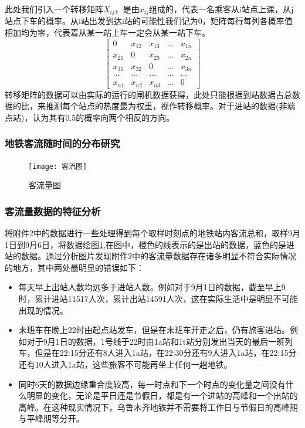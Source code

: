 \documentclass[12pt,a4paper]{mcmthesis}
\begin{document}
    此处我们引入一个转移矩阵$X_{ij}$，是由$x_{ij}$组成的，代表一名乘客从i站点上课，从j站点下车的概率。从i站出发到达i站的可能性我们记为0，矩阵每行每列各概率值相加均为零，代表着从某一站上车一定会从某一站下车。
    \begin{equation}
        \begin{bmatrix}
            0 &x_{12}  &x_{13} &... & x_{1n}\\
            x_{21} &0  &x_{23} & ... &x_{2n} \\
            x_{31} & x_{32} &0 & ...&x_{3n} \\
            ...&  ... &   ...&  ... &...\\
            x_{n1} & x_{n2} &x_{n3} &... &0
        \end{bmatrix}
    \end{equation}
    转移矩阵的数据可以由实际的运行的闸机数据获得，此处只能根据到站数据占总数据的比，来推测每个站点的热度最为权重，视作转移概率。对于进站的数据(非端点站)，认为其有0.5的概率向两个相反的方向。

    \subsubsection{地铁客流随时间的分布研究}
    \begin{figure}[h!t]
        \centerline{\texttt{[image: 客流图]}\quad
        }
        \caption{\song\wuhao
        客流量图}
        \label{fig:客流量}
    \end{figure}

    \subsubsection{客流量数据的特征分析}

    将附件2中的数据进行一些处理得到每个取样时刻点的地铁站内客流总和，取样9月1日到9月6日，将数据绘图\ref{fig:客流量},在图中，橙色的线表示的是出站的数据，蓝色的是进站的数据。通过分析图片发现附件2中的客流量数据存在诸多明显不符合实际情况的地方，其中两处最明显的错误如下：

    \begin{itemize}
        \item 每天早上出站人数均远多于进站人数。例如对于9月1日的数据，截至早上9时，累计进站11517人次，累计出站14591人次，这在实际生活中是明显不可能出现的情况。
        \item 末班车在晚上22时由起点站发车，但是在末班车开走之后，仍有旅客进站。例如对于9月1日的数据，1号线于22时由1a站和1t站分别发出当天的最后一班列车，但是在22:15分还有8人进入1a站，在22:30分还有9人进入1a站，在22:15分还有10人进入1a站，这些旅客不可能再坐上任何一趟地铁。
        \item 同时6天的数据边缘重合度较高，每一时点和下一个时点的变化量之间没有什么明显的变化，无论是平日还是节假日，都是有一个进站的高峰和一个出站的高峰。在这种现实情况下，乌鲁木齐地铁并不需要将工作日与节假日的高峰期与平峰期等分开。
    \end{itemize}
\end{document}

